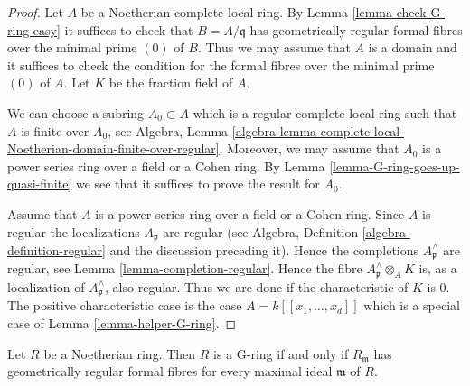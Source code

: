 \begin{proof}
Let $A$ be a Noetherian complete local ring. By
Lemma \ref{lemma-check-G-ring-easy}
it suffices to check that $B = A/\mathfrak q$ has geometrically regular
formal fibres over the minimal prime $(0)$ of $B$. Thus we may assume
that $A$ is a domain and it suffices to check the condition for
the formal fibres over the minimal prime $(0)$ of $A$.
Let $K$ be the fraction field of $A$.

\medskip\noindent
We can choose a subring $A_0 \subset A$ which is a regular complete local
ring such that $A$ is finite over $A_0$, see Algebra, Lemma
\ref{algebra-lemma-complete-local-Noetherian-domain-finite-over-regular}.
Moreover, we may assume that $A_0$ is a power series ring over a
field or a Cohen ring. By Lemma \ref{lemma-G-ring-goes-up-quasi-finite}
we see that it suffices to prove the result for $A_0$.

\medskip\noindent
Assume that $A$ is a power series ring over a field or a Cohen ring.
Since $A$ is regular the localizations $A_\mathfrak p$ are regular
(see Algebra, Definition \ref{algebra-definition-regular} and the
discussion preceding it).
Hence the completions $A_\mathfrak p^\wedge$ are regular, see
Lemma \ref{lemma-completion-regular}.
Hence the fibre $A_{\mathfrak p}^\wedge \otimes_A K$ is, as a localization
of $A_\mathfrak p^\wedge$, also regular. Thus we are done if the
characteristic of $K$ is $0$. The positive characteristic case
is the case $A = k[[x_1, \ldots, x_d]]$ which is a special case of
Lemma \ref{lemma-helper-G-ring}.
\end{proof}

\begin{lemma}
\label{lemma-check-G-ring-maximal-ideals}
Let $R$ be a Noetherian ring. Then $R$ is a G-ring if and only if
$R_\mathfrak m$ has geometrically regular formal fibres for every
maximal ideal $\mathfrak m$ of $R$.
\end{lemma}

